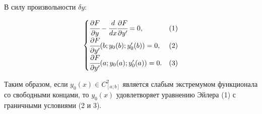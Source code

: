     В силу произвольности $\delta y$:

    \[ \begin{cases}
        \cfrac{\partial F}{\partial y} - \cfrac{d}{dx} \cfrac{\partial F}{\partial y'} = 0, & (1)\\
        \cfrac{\partial F}{\partial y'} (b; y_0(b); y'_0(b)) = 0, & (2)\\
        \cfrac{\partial F}{\partial y'} (a; y_0(a); y'_0(a)) = 0. & (3)\\
    \end{cases}
    \]

    Таким образом, если $y_0(x) \in C^2_{[a;b]}$ является слабым экстремумом функционала со свободными концами, то $y_0(x)$ удовлетворяет уравнению Эйлера (1) с граничными условиями (2 и 3).